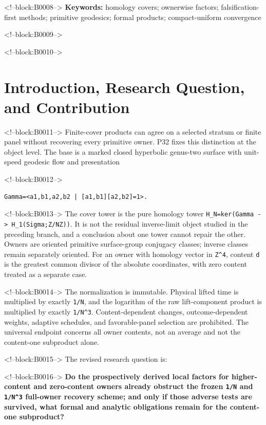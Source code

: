 \documentclass[11pt]{article}
\begin{document}
<!--block:B0008-->
\noindent\textbf{Keywords:} homology covers; ownerwise factors;
falsification-first methods; primitive geodesics; formal products;
compact-uniform convergence

<!--block:B0009-->
\medskip
{}

<!--block:B0010-->
\hypertarget{1-introduction-research-question-and-contribution}{%
\section{Introduction, Research Question, and
Contribution}\label{1-introduction-research-question-and-contribution}}

<!--block:B0011-->
Finite-cover products can agree on a selected stratum or finite panel
without recovering every primitive owner. P32 fixes this distinction at
the object level. The base is a marked closed hyperbolic genus-two
surface with unit-speed geodesic flow and presentation

<!--block:B0012-->
\begin{verbatim}
Gamma=<a1,b1,a2,b2 | [a1,b1][a2,b2]=1>.
\end{verbatim}

<!--block:B0013-->
The cover tower is the pure homology tower
\texttt{H\_N=ker(Gamma\ -\textgreater{}\ H\_1(Sigma;Z/NZ))}. It is not
the residual inverse-limit object studied in the preceding branch, and a
conclusion about one tower cannot repair the other. Owners are oriented
primitive surface-group conjugacy classes; inverse classes remain
separately oriented. For an owner with homology vector in
\texttt{Z\^{}4}, content \texttt{d} is the greatest common divisor of
the absolute coordinates, with zero content treated as a separate case.

<!--block:B0014-->
The normalization is immutable. Physical lifted time is multiplied by
exactly \texttt{1/N}, and the logarithm of the raw lift-component
product is multiplied by exactly \texttt{1/N\^{}3}. Content-dependent
changes, outcome-dependent weights, adaptive schedules, and
favorable-panel selection are prohibited. The universal endpoint
concerns all owner contents, not an average and not the content-one
subproduct alone.

<!--block:B0015-->
The revised research question is:

<!--block:B0016-->
\textbf{Do the prospectively derived local factors for higher-content
and zero-content owners already obstruct the frozen \texttt{1/N} and
\texttt{1/N\^{}3} full-owner recovery scheme; and only if those adverse
tests are survived, what formal and analytic obligations remain for the
content-one subproduct?}
\end{document}
